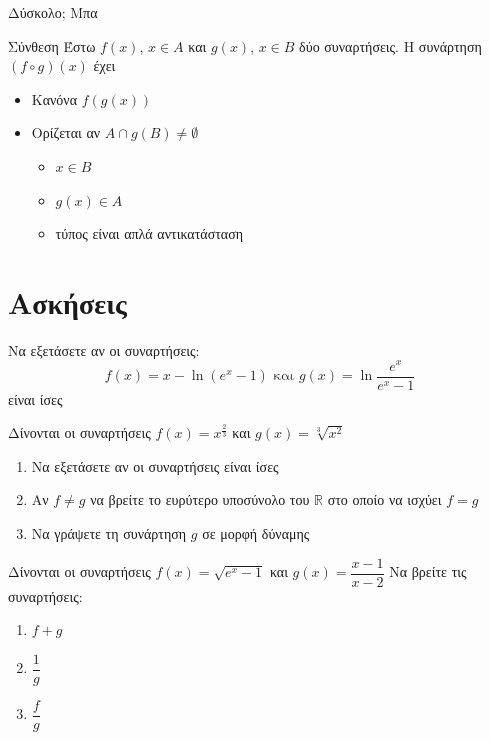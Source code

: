 \documentclass{presentation}
\begin{document}
\begin{frame}{Δύσκολο; Μπα}
  \begin{block}{Σύνθεση}
    Έστω $f(x)$, $x\in Α$ και $g(x)$, $x\in Β$ δύο συναρτήσεις. Η συνάρτηση $(f\circ g)(x)$ έχει
    \begin{itemize}
      \item Κανόνα $f(g(x))$
      \item Ορίζεται αν $Α\cap g(Β)\ne \emptyset$
            \begin{itemize}
              \item<2-> $x\in Β$
              \item<3-> $g(x)\in Α$
              \item<4-> τύπος είναι απλά αντικατάσταση
            \end{itemize}
    \end{itemize}
  \end{block}
\end{frame}

\moodle

\section{Ασκήσεις}

\exercises

\begin{askisi}
  Να εξετάσετε αν οι συναρτήσεις:
  $$f(x)=x-\ln (e^x-1) \text{ και } g(x)=\ln\frac{e^x}{e^x-1}$$
  είναι ίσες

\end{askisi}

\begin{askisi}
  Δίνονται οι συναρτήσεις $f(x)=x^{\frac{2}{3}}$ και $g(x)=\sqrt[3]{x^2}$
  \begin{enumerate}
    \item<1-> Να εξετάσετε αν οι συναρτήσεις είναι ίσες
    \item<2-> Αν $f\ne g$ να βρείτε το ευρύτερο υποσύνολο του $\mathbb{R}$ στο οποίο να ισχύει $f=g$
    \item<3-> Να γράψετε τη συνάρτηση $g$ σε μορφή δύναμης
  \end{enumerate}

\end{askisi}

\begin{askisi}
  Δίνονται οι συναρτήσεις $f(x)=\sqrt{e^x-1}$ και $g(x)=\dfrac{x-1}{x-2}$
  Να βρείτε τις συναρτήσεις:
  \begin{enumerate}
    \item<1-> $f+g$
    \item<2-> $\dfrac{1}{g}$
    \item<3-> $\dfrac{f}{g}$
  \end{enumerate}

\end{askisi}
\end{document}
